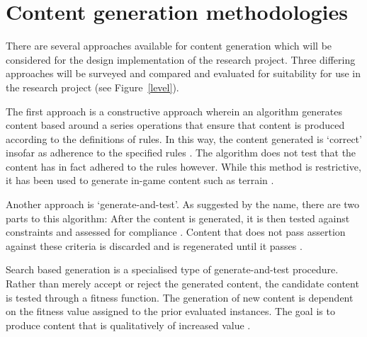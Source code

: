 \documentclass[11pt, a4paper, oneside]{report} %
\begin{document}
\section{Content generation methodologies}

There are several approaches available for content generation which will be
considered for the design implementation of the research project. Three
differing approaches will be surveyed and compared and evaluated for suitability
for use in the research project (see Figure~\ref{level}).

The first approach is a constructive approach wherein an algorithm generates
content based around a series operations that ensure that content is produced
according to the definitions of rules. In this way, the content generated is
`correct' insofar as adherence to the specified rules
\cite{browne2008automatic}. The algorithm does not test that the content has in
fact adhered to the rules however. While this method is restrictive, it has been
used to generate in-game content such as terrain
\cite{Miller:1986:DRT:15886.15890}.

Another approach is `generate-and-test'. As suggested by the name, there are two
parts to this algorithm: After the content is generated, it is then tested
against constraints and assessed for compliance \cite{5756645}. Content that
does not pass assertion against these criteria is discarded and is regenerated
until it passes \cite{5756645}.

Search based generation is a specialised type of generate-and-test procedure.
Rather than merely accept or reject the generated content, the candidate content
is tested through a fitness function. The generation of new content is dependent
on the fitness value assigned to the prior evaluated instances. The goal is to
produce content that is qualitatively of increased value \cite{5756645}.



\end{document}
